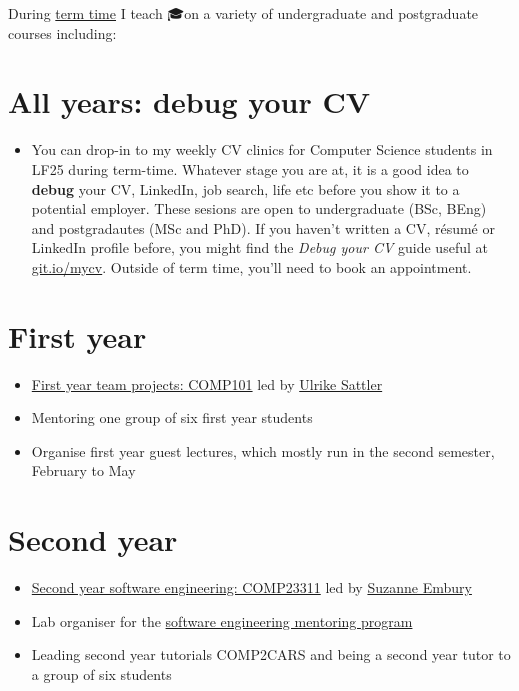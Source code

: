 \documentclass[12pt,]{book}
\providecommand{\tightlist}{%
  \setlength{\itemsep}{0pt}\setlength{\parskip}{0pt}}
\begin{document}
During \href{https://www.manchester.ac.uk/discover/key-dates/}{term time} I teach 🎓on a variety of undergraduate and postgraduate courses including:

\hypertarget{all-years-debug-your-cv}{%
\section{All years: debug your CV}\label{all-years-debug-your-cv}}

\begin{itemize}
\tightlist
\item
  You can drop-in to my weekly CV clinics for Computer Science students in LF25 during term-time. Whatever stage you are at, it is a good idea to \textbf{debug} your CV, LinkedIn, job search, life etc before you show it to a potential employer. These sesions are open to undergraduate (BSc, BEng) and postgradautes (MSc and PhD). If you haven't written a CV, résumé or LinkedIn profile before, you might find the \emph{Debug your CV} guide useful at \href{http://git.io/mycv}{git.io/mycv}. Outside of term time, you'll need to book an appointment.
\end{itemize}

\hypertarget{first-year}{%
\section{First year}\label{first-year}}

\begin{itemize}
\tightlist
\item
  \href{https://studentnet.cs.manchester.ac.uk/ugt/COMP10120/syllabus/}{First year team projects: COMP101} led by \href{http://www.cs.man.ac.uk/~sattler/}{Ulrike Sattler}
\item
  Mentoring one group of six first year students
\item
  Organise first year guest lectures, which mostly run in the second semester, February to May
\end{itemize}

\hypertarget{second-year}{%
\section{Second year}\label{second-year}}

\begin{itemize}
\tightlist
\item
  \href{https://studentnet.cs.manchester.ac.uk/ugt/COMP23311/syllabus/}{Second year software engineering: COMP23311} led by \href{http://www.cs.man.ac.uk/~embury/}{Suzanne Embury}
\item
  Lab organiser for the \href{https://www.cs.manchester.ac.uk/connect/business-engagement/industrial-mentoring/}{software engineering mentoring program}
\item
  Leading second year tutorials COMP2CARS and being a second year tutor to a group of six students
\end{itemize}
\end{document}
